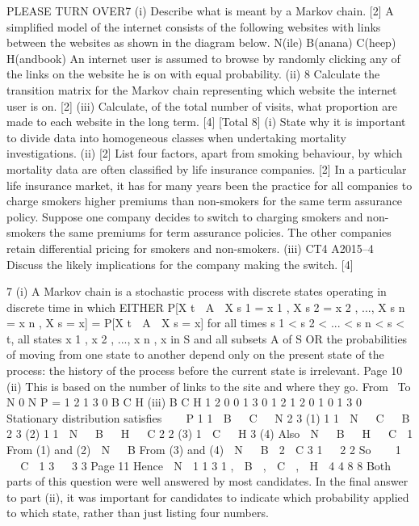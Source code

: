 \documentclass[a4paper,12pt]{article}
\begin{document}
\begin{enumerate}
PLEASE TURN OVER7
(i)
Describe what is meant by a Markov chain.
[2]
A simplified model of the internet consists of the following websites with links
between the websites as shown in the diagram below.
N(ile) B(anana)
C(heep) H(andbook)
An internet user is assumed to browse by randomly clicking any of the links on the
website he is on with equal probability.
(ii)
8
Calculate the transition matrix for the Markov chain representing which
website the internet user is on.
[2]
(iii) Calculate, of the total number of visits, what proportion are made to each
website in the long term.
[4]
[Total 8]
(i) State why it is important to divide data into homogeneous classes when
undertaking mortality investigations.
(ii)
[2]
List four factors, apart from smoking behaviour, by which mortality data are
often classified by life insurance companies.
[2]
In a particular life insurance market, it has for many years been the practice for all
companies to charge smokers higher premiums than non-smokers for the same term
assurance policy. Suppose one company decides to switch to charging smokers and
non-smokers the same premiums for term assurance policies. The other companies
retain differential pricing for smokers and non-smokers.
(iii)
CT4 A2015–4
Discuss the likely implications for the company making the switch.
[4]



7
(i)
A Markov chain is a stochastic process with discrete states operating in
discrete time in which
EITHER
P[X t  A  X s 1 = x 1 , X s 2 = x 2 , ..., X s n = x n , X s = x] = P[X t  A  X s = x]
for all times s 1 < s 2 < ... < s n < s < t, all states x 1 , x 2 , ..., x n , x in S and all
subsets A of S
OR
the probabilities of moving from one state to another depend only on the
present state of the process: the history of the process before the current state
is irrelevant.
Page 10 %
(ii)
This is based on the number of links to the site and where they go.
From \ To N
0
N
P =
1
2
1
3
0
B
C
H
(iii)
B C H
1
2 0
0
1
3
0
1
2
1
2
0
1
0
1
3
0
Stationary distribution satisfies    P
1
1
 B   C   N
2
3 (1)
1
1
 N   C   B
2
3 (2)
1
1
 N   B   H   C
2
2 (3)
1
 C   H
3 (4)
Also  N   B   H   C  1
From (1) and (2)
 N   B
From (3) and (4)
 N   B 
2
 C
3
1 
 2 2
So    1    C  1
3 
 3 3
Page 11 %
Hence
 N 
1
1
3
1
,  B  ,  C  ,  H 
4
4
8
8
Both parts of this question were well answered by most candidates. In the final answer to
part (ii), it was important for candidates to indicate which probability applied to which
state, rather than just listing four numbers.


\end{enumerate}
\end{document}
